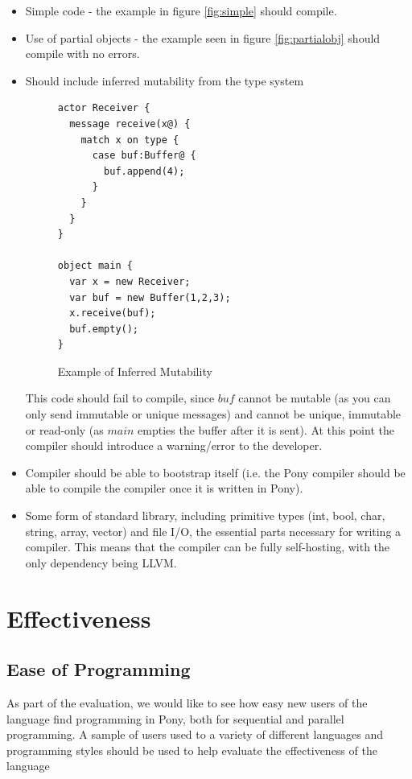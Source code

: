 \documentclass[11pt,a4paper]{report}
\begin{document}
\begin{itemize}

\item Simple code - the example in figure \ref{fig:simple} should compile.
\item Use of partial objects - the example seen in figure \ref{fig:partialobj} should compile with no errors.

\item Should include inferred mutability from the type system

\begin{figure}[H]
\begin{verbatim}
actor Receiver {
  message receive(x@) {
    match x on type {
      case buf:Buffer@ {
        buf.append(4);
      }
    }
  }
}

object main {
  var x = new Receiver;
  var buf = new Buffer(1,2,3);
  x.receive(buf);
  buf.empty();
}
\end{verbatim}
\caption{Example of Inferred Mutability}
\end{figure}

This code should fail to compile, since $buf$ cannot be mutable (as you can only send immutable or unique messages) and cannot be unique, immutable or read-only (as $main$ empties the buffer after it is sent).
At this point the compiler should introduce a warning/error to the developer.

\item Compiler should be able to bootstrap itself (i.e. the Pony compiler should be able to compile the compiler once it is written in Pony).

\item Some form of standard library, including primitive types (int, bool, char, string, array, vector) and file I/O, the essential parts necessary for writing a compiler.
	This means that the compiler can be fully self-hosting, with the only dependency being LLVM.
\end{itemize}

\section{Effectiveness}
\subsection{Ease of Programming}

As part of the evaluation, we would like to see how easy new users of the language find programming in Pony, both for sequential and parallel programming.
A sample of users used to a variety of different languages and programming styles should be used to help evaluate the effectiveness of the language
\end{document}

